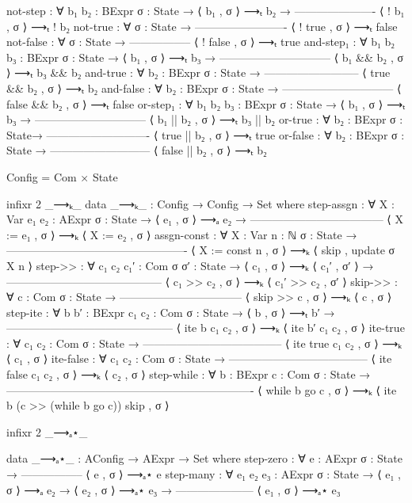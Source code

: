 \documentclass{lecturenotes}
\begin{document}
\begin{code}[hide]
  not-step : ∀ {b₁ b₂ : BExpr} {σ : State} →
       ⟨ b₁ , σ ⟩ ⟶ₜ b₂ →
    ----------------------
     ⟨ ! b₁ , σ ⟩ ⟶ₜ ! b₂
  not-true : ∀ {σ : State} →
    -------------------------
     ⟨ ! true , σ ⟩ ⟶ₜ false
  not-false : ∀ {σ : State} → 
    -----------------
     ⟨ ! false , σ ⟩ ⟶ₜ true
  and-step₁ : ∀ {b₁ b₂ b₃ : BExpr} {σ : State} →
           ⟨ b₁ , σ ⟩ ⟶ₜ b₃ →
    ------------------------------
     ⟨ b₁ && b₂ , σ ⟩ ⟶ₜ b₃ && b₂
  and-true : ∀ {b₂ : BExpr} {σ : State} →
    --------------------------
     ⟨ true && b₂ , σ ⟩ ⟶ₜ b₂
  and-false : ∀ {b₂ : BExpr} {σ : State} →
    ------------------------------
     ⟨ false && b₂ , σ ⟩ ⟶ₜ false
  or-step₁ : ∀ {b₁ b₂ b₃ : BExpr} {σ : State} →
           ⟨ b₁ , σ ⟩ ⟶ₜ b₃ →
    ------------------------------
     ⟨ b₁ || b₂ , σ ⟩ ⟶ₜ b₃ || b₂
  or-true : ∀ {b₂ : BExpr} {σ : State}→
    ----------------------------
     ⟨ true || b₂ , σ ⟩ ⟶ₜ true
  or-false : ∀ {b₂ : BExpr} {σ : State} →
    ---------------------------
     ⟨ false || b₂ , σ ⟩ ⟶ₜ b₂

Config = Com × State

infixr 2 _⟶ₖ_
data _⟶ₖ_ : Config → Config → Set where
  step-assgn : ∀ {X : Var} {e₁ e₂ : AExpr} {σ : State} →
          ⟨ e₁ , σ ⟩ ⟶ₐ e₂ →
    ------------------------------------
     ⟨ X := e₁ , σ ⟩ ⟶ₖ ⟨ X := e₂ , σ ⟩
  assgn-const : ∀ {X : Var} {n : ℕ} {σ : State} →
    -------------------------------------------------
     ⟨ X := const n , σ ⟩ ⟶ₖ ⟨ skip , update σ X n ⟩
  step->> : ∀ {c₁ c₂ c₁′ : Com} {σ σ′ : State} →
            ⟨ c₁ , σ ⟩ ⟶ₖ ⟨ c₁′ , σ′ ⟩ →
    ------------------------------------------
     ⟨ c₁ >> c₂ , σ ⟩ ⟶ₖ ⟨ c₁′ >> c₂ , σ′ ⟩
  skip->> : ∀ {c : Com} {σ : State} →
    ---------------------------------
     ⟨ skip >> c , σ ⟩ ⟶ₖ ⟨ c , σ ⟩
  step-ite : ∀ {b b′ : BExpr} {c₁ c₂ : Com} {σ : State} →
               ⟨ b , σ ⟩ ⟶ₜ b′ →
    ---------------------------------------------
     ⟨ ite b c₁ c₂ , σ ⟩ ⟶ₖ ⟨ ite b′ c₁ c₂ , σ ⟩ 
  ite-true : ∀ {c₁ c₂ : Com} {σ : State} →
    --------------------------------------
     ⟨ ite true c₁ c₂ , σ ⟩ ⟶ₖ ⟨ c₁ , σ ⟩
  ite-false : ∀ {c₁ c₂ : Com} {σ : State} →
    --------------------------------------
     ⟨ ite false c₁ c₂ , σ ⟩ ⟶ₖ ⟨ c₂ , σ ⟩
  step-while : ∀ {b : BExpr} {c : Com} {σ : State} →
    -------------------------------------------------------------------
     ⟨ while b go c , σ ⟩ ⟶ₖ ⟨ ite b (c >> (while b go c)) skip , σ ⟩ 

infixr 2 _⟶ₐ⋆_

data _⟶ₐ⋆_ : AConfig → AExpr → Set where 
  step-zero : ∀ {e : AExpr} {σ : State} →
    -----------------
     ⟨ e , σ ⟩ ⟶ₐ⋆ e
  step-many : ∀ {e₁ e₂ e₃ : AExpr} {σ : State} →
    ⟨ e₁ , σ ⟩ ⟶ₐ  e₂ →
    ⟨ e₂ , σ ⟩ ⟶ₐ⋆ e₃ →
    ---------------------
      ⟨ e₁ , σ ⟩ ⟶ₐ⋆ e₃ 


\end{code}
\end{document}
